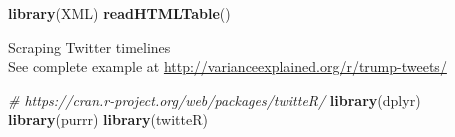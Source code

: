 \documentclass[10,portrait]{article}
\newenvironment{Shaded}{\begin{snugshade}}{\end{snugshade}}
\newcommand{\KeywordTok}[1]{\textcolor[rgb]{0.13,0.29,0.53}{\textbf{#1}}}
\newcommand{\CommentTok}[1]{\textcolor[rgb]{0.56,0.35,0.01}{\textit{#1}}}
\newcommand{\NormalTok}[1]{#1}
\begin{document}
\begin{Shaded}
\begin{Highlighting}[]
\KeywordTok{library}\NormalTok{(XML)}
\KeywordTok{readHTMLTable}\NormalTok{()}
\end{Highlighting}
\end{Shaded}

Scraping Twitter timelines\\
See complete example at
\url{http://varianceexplained.org/r/trump-tweets/}

\begin{Shaded}
\begin{Highlighting}[]
\CommentTok{# https://cran.r-project.org/web/packages/twitteR/}
\KeywordTok{library}\NormalTok{(dplyr)}
\KeywordTok{library}\NormalTok{(purrr)}
\KeywordTok{library}\NormalTok{(twitteR)}
\end{Highlighting}
\end{Shaded}

\printbibliography
\end{document}
